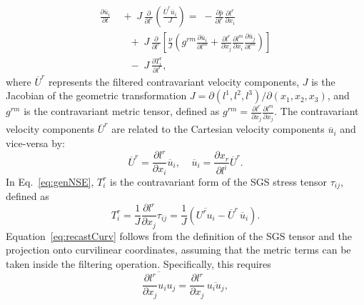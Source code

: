 \documentclass[final,3p]{elsarticle}
\begin{document}
\begin{equation}
	\begin{split}
		\frac{\partial \overline{u}_i}{\partial t}
		&\;+\;J\,\frac{\partial }{\partial l^{r}} \left( \frac{\overline{U}^{r} \overline{u}_i}{J}\right)
		=\;-\frac{\partial \overline{p}}{\partial l^{r}} \frac{\partial l^{r}}{\partial x_i}\\
		&\quad +\;J\,\frac{\partial} {\partial l^{r}} 
		\left[\frac{\nu}{J} 
		\left( g^{rm} \frac{\partial \overline{u}_i}{\partial l^{m}} 
		+ \frac{\partial l^{r}}{\partial x_j}  \frac{\partial l^{m}}{\partial x_i} \frac{\partial \overline{u}_{j}}{\partial l^m}
		\right) 
		\right]\\
		&\quad -\;J\,\frac{\partial T^r_i}{\partial l^{r}} 
		,
		\label{eq:genNSE}
	\end{split}
\end{equation}
%
where $\overline{U}^{r}$ represents the filtered contravariant velocity components, $J$ is the Jacobian of the geometric transformation $J = \partial (l^{1}, l^{2}, l^{3})/\partial (x_1, x_2, x_3)$, and $g^{rm}$ is the contravariant metric tensor, defined as $g^{rm} = \frac{\partial l^{r}}{\partial x_j} \frac{\partial l^{m}}{\partial x_j}$. The contravariant velocity components $\overline{U}^{r}$ are related to the Cartesian velocity components $\overline{u}_i$ and vice-versa by:
\begin{equation}
	\overline{U}^{r} =  \frac{\partial l^{r}}{\partial x_i}\overline{u}_i,~~~~~\overline{u}_{i} = \frac{\partial x_{r}}{\partial l^i}\overline{U}^{r}.
\end{equation}
%
In Eq.~\ref{eq:genNSE}, \(T^r_i\) is the contravariant form of the SGS stress tensor
\(\tau_{ij}\), defined as
\begin{equation}
    T^r_i = \frac{1}{J} \frac{\partial l^r}{\partial x_j} \tau_{ij} 
    = \frac{1}{J} \left( \overline{U^r u_i} - \overline{U}^r \, \overline{u}_i \right).
    \label{eq:recastCurv}
\end{equation}
%
Equation~\eqref{eq:recastCurv} follows from the definition of the SGS tensor and
the projection onto curvilinear coordinates, assuming that the metric terms
can be taken inside the filtering operation. Specifically, this requires
\begin{equation}
    \overline{\frac{\partial l^r}{\partial x_j} u_i u_j} =
    \frac{\partial l^r}{\partial x_j} \, \overline{u_i u_j},
    \label{eq:metricFilterCommute}
\end{equation}
\end{document}
